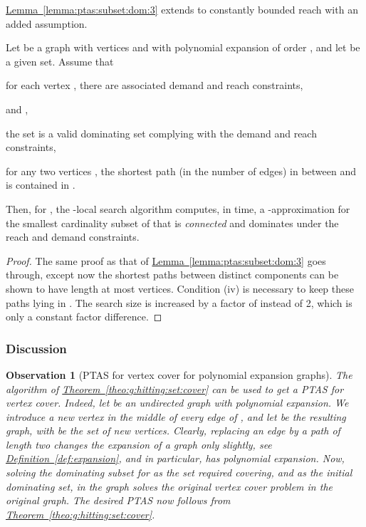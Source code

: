 \documentclass[12pt]{article}
\newcommand{\Term}[1]{\textsf{#1}}
\newtheorem{observation}[theorem]{Observation}
\theoremstyle{remark}\theoremheaderfont{\sf}\theorembodyfont{\upshape}
\numberwithin{figure}{section}\numberwithin{table}{section}\numberwithin{equation}{section}
\newcommand{\HLink}[2]{\hyperref[#2]{#1~\ref*{#2}}}
\newcommand{\defref}[1]{\HLink{Definition}{def:#1}}
\newcommand{\lemlab}[1]{\label{lemma:#1}}
\newcommand{\lemref}[1]{\HLink{Lemma}{lemma:#1}}
\newcommand{\obslab}[1]{\label{observation:#1}}
\newcommand{\thmref}[1]{\HLink{Theorem}{theo:#1}}
\newcommand{\PTAS}{\Term{PTAS}\xspace}
\begin{document}
\lemref{ptas:subset:dom:3} extends to constantly bounded reach with an
added assumption.
\begin{lemma}
  \lemlab{ptas:subset:dom:4} Let  be a graph with  vertices and with polynomial
  expansion of order , and let  be a
  given set. Assume that
  \begin{compactenum}[\quad(i)]
  \item for each vertex , there are associated demand
     and reach  constraints,
\item  and
    ,
\item the set  is a valid dominating set complying with the
    demand and reach constraints,
\item for any two vertices , the shortest path (in
    the number of edges) in  between  and  is contained
    in .
  \end{compactenum}
  Then, for , the
  -local search algorithm computes, in 
  time, a -approximation for the smallest cardinality
  subset of  that is \emph{connected} and dominates
   under the reach and demand constraints.
\end{lemma}

\begin{proof}
  The same proof as that of \lemref{ptas:subset:dom:3} goes through,
  except now the shortest paths between distinct components can be
  shown to have length at most  vertices. Condition
  (iv) is necessary to keep these paths lying in . The search size
  is increased by a factor of  instead of 2, which is
  only a constant factor difference.
\end{proof}


\subsubsection{Discussion}


\begin{observation}[\PTAS for vertex cover for polynomial expansion
  graphs]
  \obslab{v:c:poly:expansion}The algorithm of \thmref{g:hitting:set:cover} can be used to get a
  \PTAS for vertex cover. Indeed, let  be an undirected
  graph with polynomial expansion. We introduce a new vertex in the
  middle of every edge of , and let  be the resulting
  graph, with  be the set of new vertices. Clearly, replacing
  an edge by a path of length two changes the expansion of a graph
  only slightly, see \defref{expansion}, and in particular, 
  has polynomial expansion. Now, solving the dominating subset for
   as the set required covering, and  as the
  initial dominating set, in the graph  solves the original
  vertex cover problem in the original graph. The desired \PTAS now
  follows from \thmref{g:hitting:set:cover}.
\end{observation}
\end{document}
